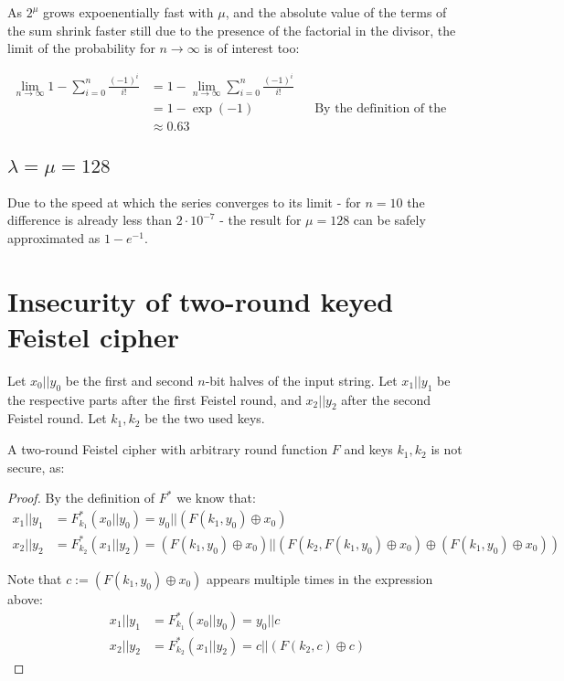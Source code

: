 \documentclass[a4paper]{scrreprt}
\begin{document}
As $2^\mu$ grows expoenentially fast with $\mu$, and the absolute value of the
terms of the sum shrink faster still due to the presence of the factorial in
the divisor, the limit of the probability for $n \to \infty$ is of interest
too:

\begin{align*}
	\lim_{n \to \infty} 1 - \sum_{i = 0}^{n} \frac{(-1)^i}{i!} & = 1 - \lim_{n \to \infty} \sum_{i = 0}^{n} \frac{(-1)^i}{i!} \\
	& = 1 - \exp(-1) && \text{By the definition of the exponential function} \\
	& \approx 0.63
\end{align*}

\subsection{$\lambda = \mu = 128$}

Due to the speed at which the series converges to its limit - for $n = 10$ the
difference is already less than $2 \cdot 10^{-7}$ - the result for $\mu = 128$
can be safely approximated as $1 - e^{-1}$.

\section{Insecurity of two-round keyed Feistel cipher}

Let $x_0 || y_0$ be the first and second $n$-bit halves of the input string.
Let $x_1 || y_1$ be the respective parts after the first Feistel round, and
$x_2 || y_2$ after the second Feistel round. Let $k_1, k_2$ be the two used
keys.

A two-round Feistel cipher with arbitrary round function $F$ and keys $k_1,
k_2$ is not secure, as:

\begin{proof}
	By the definition of $F^*$ we know that:
	\begin{align*}
		x_1 || y_1 & = F_{k_1}^*(x_0 || y_0) = y_0 || (F(k_1, y_0) \oplus x_0) \\
		x_2 || y_2 & = F_{k_2}^*(x_1 || y_2) = (F(k_1, y_0) \oplus x_0) || (F(k_2, F(k_1, y_0) \oplus x_0) \oplus (F(k_1, y_0) \oplus x_0))
	\end{align*}

	Note that $c:= (F(k_1, y_0) \oplus x_0)$ appears multiple times in the expression above:
	\begin{align*}
		x_1 || y_1 & = F_{k_1}^*(x_0 || y_0) = y_0 || c \\
		x_2 || y_2 & = F_{k_2}^*(x_1 || y_2) = c || (F(k_2, c) \oplus c)
	\end{align*}
\end{proof}
\end{document}
